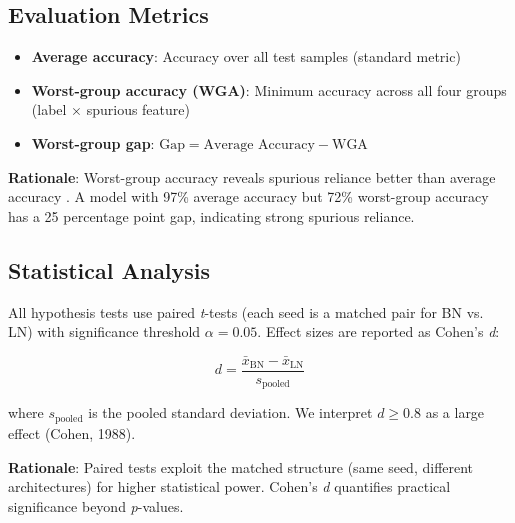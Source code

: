 \subsection{Evaluation Metrics}

\begin{itemize}
\item \textbf{Average accuracy}: Accuracy over all test samples (standard metric)
\item \textbf{Worst-group accuracy (WGA)}: Minimum accuracy across all four groups (label $\times$ spurious feature)
\item \textbf{Worst-group gap}: $\text{Gap} = \text{Average Accuracy} - \text{WGA}$
\end{itemize}

\textbf{Rationale}: Worst-group accuracy reveals spurious reliance better than average accuracy \cite{sagawa2020distributionally}. A model with 97\% average accuracy but 72\% worst-group accuracy has a 25 percentage point gap, indicating strong spurious reliance.

\subsection{Statistical Analysis}

All hypothesis tests use paired \emph{t}-tests (each seed is a matched pair for BN vs. LN) with significance threshold $\alpha = 0.05$. Effect sizes are reported as Cohen's \emph{d}:

\begin{equation}
d = \frac{\bar{x}_{\text{BN}} - \bar{x}_{\text{LN}}}{s_{\text{pooled}}}
\end{equation}

where $s_{\text{pooled}}$ is the pooled standard deviation. We interpret $d \geq 0.8$ as a large effect (Cohen, 1988).

\textbf{Rationale}: Paired tests exploit the matched structure (same seed, different architectures) for higher statistical power. Cohen's \emph{d} quantifies practical significance beyond \emph{p}-values.
